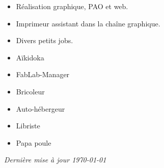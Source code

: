 \documentclass[10pt,a4paper,ragged2e,withhyper,normalphoto]{altacv}
\begin{document}
\begin{paracol}{2}
\divider

\begin{itemize}
\item Réalisation graphique, PAO et web.
\end{itemize}

\divider

\begin{itemize}
\item Imprimeur assistant dans la chaîne graphique.
\end{itemize}

\divider

\begin{itemize}
\item Divers petits jobs.
\end{itemize}

\end{paracol}


\begin{paracol}{2}

\begin{itemize}
\item Aïkidoka
\item FabLab-Manager
\item Bricoleur
\switchcolumn
\item Auto-hébergeur
\item Libriste
\item Papa poule
\end{itemize}

\end{paracol}

\bigskip

\raggedleft
{\textit{Dernière mise à jour \today}}
\end{document}
